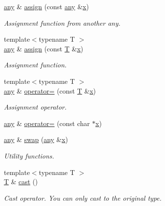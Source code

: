 \begin{DoxyCompactItemize}
\hyperlink{structcvflann_1_1any}{any} \& \hyperlink{structcvflann_1_1any_a93340efbe792946f31c9590176cc245e}{assign} (const \hyperlink{structcvflann_1_1any}{any} \&\hyperlink{highgui__c_8h_a6150e0515f7202e2fb518f7206ed97dc}{x})
\begin{DoxyCompactList}\small\item\em Assignment function from another any. \end{DoxyCompactList}\item 
{\footnotesize template$<$typename T $>$ }\\\hyperlink{structcvflann_1_1any}{any} \& \hyperlink{structcvflann_1_1any_aa7b590fb6d936c0ec41f07b4c0944a5b}{assign} (const \hyperlink{calib3d_8hpp_a3efb9551a871ddd0463079a808916717}{T} \&\hyperlink{highgui__c_8h_a6150e0515f7202e2fb518f7206ed97dc}{x})
\begin{DoxyCompactList}\small\item\em Assignment function. \end{DoxyCompactList}\item 
{\footnotesize template$<$typename T $>$ }\\\hyperlink{structcvflann_1_1any}{any} \& \hyperlink{structcvflann_1_1any_a21f7f4442898eb3c5fb9971dc9a6d0ba}{operator=} (const \hyperlink{calib3d_8hpp_a3efb9551a871ddd0463079a808916717}{T} \&\hyperlink{highgui__c_8h_a6150e0515f7202e2fb518f7206ed97dc}{x})
\begin{DoxyCompactList}\small\item\em Assignment operator. \end{DoxyCompactList}\item 
\hyperlink{structcvflann_1_1any}{any} \& \hyperlink{structcvflann_1_1any_a5146e87ec22f45b1ca806ec25c98956a}{operator=} (const char $\ast$\hyperlink{highgui__c_8h_a6150e0515f7202e2fb518f7206ed97dc}{x})
\item 
\hyperlink{structcvflann_1_1any}{any} \& \hyperlink{structcvflann_1_1any_a77373c634d1cb126148f2e8b8a94f8ff}{swap} (\hyperlink{structcvflann_1_1any}{any} \&\hyperlink{highgui__c_8h_a6150e0515f7202e2fb518f7206ed97dc}{x})
\begin{DoxyCompactList}\small\item\em Utility functions. \end{DoxyCompactList}\item 
{\footnotesize template$<$typename T $>$ }\\\hyperlink{calib3d_8hpp_a3efb9551a871ddd0463079a808916717}{T} \& \hyperlink{structcvflann_1_1any_a6434473fb7b9ef53e4bcbfd066d3435d}{cast} ()
\begin{DoxyCompactList}\small\item\em Cast operator. You can only cast to the original type. \end{DoxyCompactList}\item 

\end{DoxyCompactItemize}
